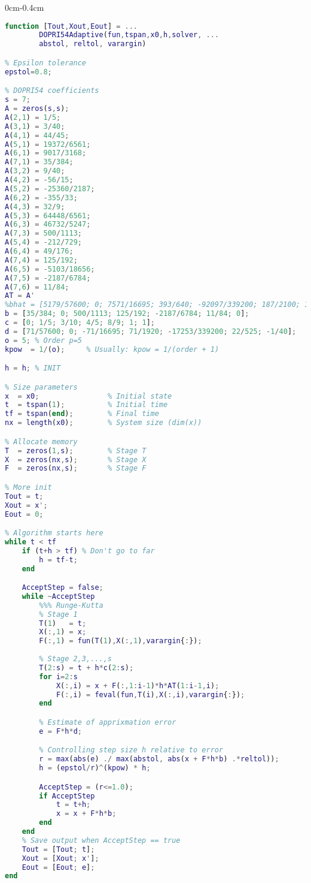 \begin{adjustwidth*}{0cm}{-0.4cm}
\begin{lstlisting}[frame=single, language=Matlab,caption=DOPRI54, label=ERKpars]
function [Tout,Xout,Eout] = ...
        DOPRI54Adaptive(fun,tspan,x0,h,solver, ...
        abstol, reltol, varargin)

% Epsilon tolerance
epstol=0.8;

% DOPRI54 coefficients 
s = 7;
A = zeros(s,s);
A(2,1) = 1/5;
A(3,1) = 3/40;
A(4,1) = 44/45;
A(5,1) = 19372/6561;
A(6,1) = 9017/3168;
A(7,1) = 35/384;
A(3,2) = 9/40;
A(4,2) = -56/15;
A(5,2) = -25360/2187;
A(6,2) = -355/33;
A(4,3) = 32/9;
A(5,3) = 64448/6561;
A(6,3) = 46732/5247;
A(7,3) = 500/1113;
A(5,4) = -212/729;
A(6,4) = 49/176;
A(7,4) = 125/192;
A(6,5) = -5103/18656;
A(7,5) = -2187/6784;
A(7,6) = 11/84;
AT = A'
%bhat = [5179/57600; 0; 7571/16695; 393/640; -92097/339200; 187/2100; 1/40];
b = [35/384; 0; 500/1113; 125/192; -2187/6784; 11/84; 0];
c = [0; 1/5; 3/10; 4/5; 8/9; 1; 1];
d = [71/57600; 0; -71/16695; 71/1920; -17253/339200; 22/525; -1/40];
o = 5; % Order p=5
kpow  = 1/(o);     % Usually: kpow = 1/(order + 1)

h = h; % INIT

% Size parameters
x  = x0;                % Initial state
t  = tspan(1);          % Initial time
tf = tspan(end);        % Final time
nx = length(x0);        % System size (dim(x))

% Allocate memory
T  = zeros(1,s);        % Stage T
X  = zeros(nx,s);       % Stage X
F  = zeros(nx,s);       % Stage F

% More init
Tout = t;        
Xout = x';
Eout = 0;

% Algorithm starts here
while t < tf
    if (t+h > tf) % Don't go to far
        h = tf-t;
    end

    AcceptStep = false;
    while ~AcceptStep
        %%% Runge-Kutta
        % Stage 1
        T(1)   = t;
        X(:,1) = x;
        F(:,1) = fun(T(1),X(:,1),varargin{:});
        
        % Stage 2,3,...,s
        T(2:s) = t + h*c(2:s);
        for i=2:s
            X(:,i) = x + F(:,1:i-1)*h*AT(1:i-1,i);
            F(:,i) = feval(fun,T(i),X(:,i),varargin{:});
        end

        % Estimate of apprixmation error
        e = F*h*d;

        % Controlling step size h relative to error
        r = max(abs(e) ./ max(abstol, abs(x + F*h*b) .*reltol));
        h = (epstol/r)^(kpow) * h;

        AcceptStep = (r<=1.0);
        if AcceptStep
            t = t+h;
            x = x + F*h*b;
        end
    end
    % Save output when AcceptStep == true
    Tout = [Tout; t];
    Xout = [Xout; x'];
    Eout = [Eout; e];
end
\end{lstlisting}
\end{adjustwidth*}




